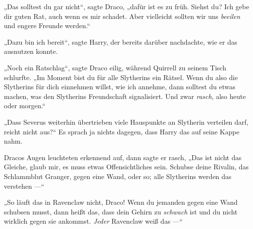 „Das solltest du gar nicht“, sagte Draco, „dafür ist es zu früh. Siehst du? Ich gebe dir guten Rat, auch wenn es mir schadet. Aber vielleicht sollten wir uns \emph{beeilen} und engere Freunde werden.“

„Dazu bin ich bereit“, sagte Harry, der bereits darüber nachdachte, wie er das ausnutzen konnte.

„Noch ein Ratschlag“, sagte Draco eilig, während Quirrell zu seinem Tisch schlurfte.
„Im Moment bist du für alle Slytherins ein Rätsel. Wenn du also die Slytherins für dich einnehmen willst, wie ich annehme, dann solltest du etwas machen, was den Slytherins Freundschaft signalisiert. Und zwar \emph{rasch}, also heute oder morgen.“

„Dass Severus weiterhin übertrieben viele Hauspunkte an Slytherin verteilen darf, reicht nicht aus?“ Es sprach ja nichts dagegen, dass Harry das auf seine Kappe nahm.

Dracos Augen leuchteten erkennend auf, dann sagte er rasch,
„Das ist nicht das Gleiche, glaub mir, es muss etwas Offensichtliches sein. Schubse deine Rivalin, das Schlammblut Granger, gegen eine Wand, oder so; alle Slytherins werden das verstehen —“

„So läuft das in Ravenclaw nicht, Draco! Wenn du jemanden gegen eine Wand schubsen musst, dann heißt das, dass dein Gehirn zu \emph{schwach} ist und du nicht wirklich gegen sie ankommst. \emph{Jeder} Ravenclaw weiß das —“

